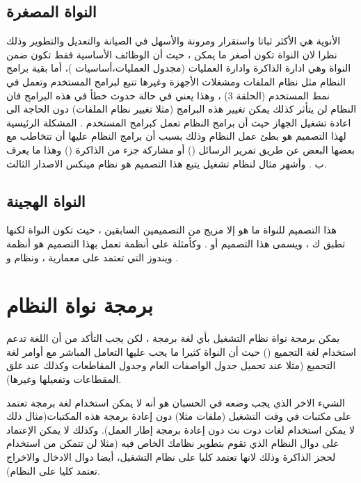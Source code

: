 \documentclass[document.tex]{subfiles}
\begin{document}
\subsection{النواة المصغرة }
الأنوية  هي الأكثر ثباتا واستقرار ومرونة والأسهل في الصيانة والتعديل والتطوير وذلك نظرا لان النواة تكون أصغر ما يمكن ، حيث أن الوظائف الأساسية فقط تكون ضمن النواة وهي ادارة الذاكرة وادارة العمليات (مجدول العمليات،أساسيات )، أما بقية برامج النظام مثل نظام الملفات ومشغلات الأجهزة وغيرها تتبع لبرامج المستخدم وتعمل في نمط المستخدم (الحلقة 3) ، وهذا يعني في حالة حدوث خطأ في هذه البرامج فان النظام لن يتأثر كذلك يمكن تغيير هذه البرامج (مثلا تغيير نظام الملفات) دون الحاجة الى اعادة تشغيل الجهاز حيث أن برامج النظام تعمل كبرامج المستخدم . %
المشكلة الرئيسية لهذا التصميم هو بطئ عمل النظام وذلك بسبب أن برامج النظام عليها أن تتخاطب مع بعضها البعض عن طريق تمرير الرسائل () أو مشاركة جزء من الذاكرة () وهذا ما يعرف ب . وأشهر مثال لنظام تشغيل يتبع هذا التصميم هو نظام مينكس الاصدار الثالث.


\subsection{النواة الهجينة }
هذا التصميم للنواة ما هو إلا مزيج من التصميمين السابقين ، حيث تكون النواة  لكنها تطبق ك  ، ويسمى هذا التصميم  أو . %
وكأمثلة على أنظمة تعمل بهذا التصميم هو أنظمة ويندوز التي تعتمد على معمارية  ، ونظام  و .



\section{برمجة نواة النظام}
يمكن برمجة نواة نظام التشغيل بأي لغة برمجة ، لكن يجب التأكد من أن اللغة تدعم استخدام لغة التجميع () حيث أن النواة كثيرا ما يجب عليها التعامل المباشر مع أوامر لغة التجميع (مثلا عند  تحميل جدول الواصفات العام وجدول المقاطعات وكذلك عند غلق المقطاعات وتفعيلها وغيرها).

الشيء الاخر الذي يجب وضعه في الحسبان هو أنه لا يمكن استخدام لغة برمجة تعتمد على مكتبات في وقت التشغيل (ملفات  مثلا) دون إعادة برمجة هذه المكتبات(مثال ذلك لا يمكن استخدام لغات دوت نت دون إعادة برمجة إطار العمل). وكذلك لا يمكن الإعتماد على دوال النظام الذي تقوم بتطوير نظامك الخاص فيه (مثلا لن تتمكن من استخدام  لحجز الذاكرة وذلك لانها تعتمد كليا على نظام التشغيل، أيضا دوال الادخال والاخراج تعتمد كليا على النظام).
\end{document}
